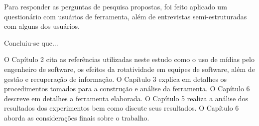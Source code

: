 

Para responder as perguntas de pesquisa propostas, foi feito aplicado um questionário com usuários de ferramenta, além de entrevistas semi-estruturadas com alguns dos usuários.

Concluiu-se que...

O Capítulo 2 cita as referências utilizadas neste estudo como o uso de mídias pelo engenheiro de software, os efeitos da rotatividade em equipes de software, além de gestão e recuperação de informação. O Capítulo 3 explica em detalhes os procedimentos tomados para a construção e análise da ferramenta. O Capítulo 6 descreve em detalhes a ferramenta elaborada. O Capítulo 5 realiza a análise dos resultados dos experimentos bem como discute seus resultados. O Capítulo 6 aborda as considerações finais sobre o trabalho.





